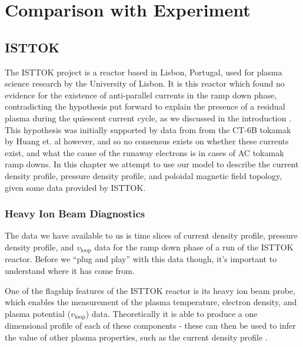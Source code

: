 
\chapter{Comparison with Experiment}
\label{chapter5}

\section{ISTTOK}

The ISTTOK project is a reactor based in Lisbon, Portugal, used for plasma science research by the 
University of Lisbon. It is this reactor which found 
no evidence for the existence of anti-parallel currents in the ramp down phase, contradicting 
the hypothesis put forward to explain the presence of a residual plasma during the quiescent 
current cycle, as we discussed in the introduction \cite{malaquias-matthew}. 
This hypothesis was initially supported by data from from the CT-6B tokamak by Huang et. al \cite{huang-ct-tokamak} however, 
and so no consensus exists on whether these currents exist, and what the cause of the runaway electrons is in cases of 
AC tokamak ramp downs. In this chapter we attempt to use our model to describe the current density profile, pressure density profile, 
and poloidal magnetic field topology, given some data provided by ISTTOK.


\subsection{Heavy Ion Beam Diagnostics}

The data we have available to us is time slices of current density profile, pressure density profile, 
and $v_{\text{loop}}$ data for the ramp down phase of a run of the ISTTOK reactor. Before 
we ``plug and play'' with this data though, it's important to understand where it has come from. 

One of the flagship features of the ISTTOK reactor is its heavy ion beam probe, which enables 
the measurement of the plasma temperature, electron density, and plasma potential ($v_{\text{loop}}$) 
data. Theoretically it is able to produce a one dimensional profile of each of these components - these 
can then be used to infer the value of other plasma properties, such as the current density profile \cite{ion-beam-diagnostics}.

